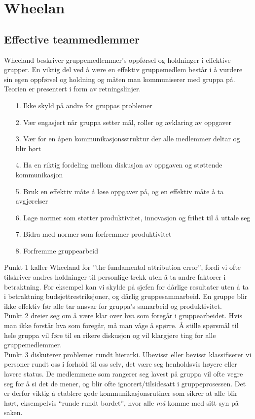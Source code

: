 \section{Wheelan}
\subsection{Effective teammedlemmer}

Wheeland beskriver gruppemedlemmer's oppførsel og holdninger i effektive grupper. En viktig del ved å være en effektiv gruppemedlem består i å vurdere sin egen oppførsel og holdning og måten man kommuniserer med gruppa på. Teorien er presentert i form av retningslinjer. 

\begin{itemize}
\item[1.] Ikke skyld på andre for gruppas problemer
\item[2.] Vær engasjert når gruppa setter mål, roller og avklaring av oppgaver
\item[3.] Vær for en åpen kommunikasjonsstruktur der alle medlemmer deltar og blir hørt 
\item[4.] Ha en riktig fordeling mellom diskusjon av oppgaven og støttende kommunikasjon
\item[5.] Bruk en effektiv måte å løse oppgaver på, og en effektiv måte å ta avgjørelser
\item[6.] Lage normer som støtter produktivitet, innovasjon og frihet til å uttale seg
\item[7.] Bidra med normer som forfremmer produktivitet
\item[8.] Forfremme gruppearbeid
\end{itemize}

Punkt 1 kaller Wheeland for ''the fundamental attribution error'', fordi vi ofte tilskriver andres holdninger til personlige trekk uten å ta andre faktorer i betraktning. For eksempel kan vi skylde på sjefen for dårlige resultater uten å ta i betraktning budsjettrestriksjoner, og dårlig gruppesammarbeid. En gruppe blir ikke effektiv før alle tar ansvar for gruppa's samarbeid og produktivitet. \\

Punkt 2 dreier seg om å være klar over hva som foregår i gruppearbeidet. Hvis man ikke forstår hva som foregår, må man våge å spørre. Å stille spørsmål til hele gruppa vil føre til en rikere diskusjon og vil klargjøre ting for alle gruppemedlemmer. \\

Punkt 3 diskuterer problemet rundt hierarki. Ubevisst eller bevisst
klassifiserer vi personer rundt oss i forhold til oss selv, det være seg
henholdsvis høyere eller lavere status. De medlemmene som rangerer seg lavest på
gruppa vil ofte vegre seg for å si det de mener, og blir ofte
ignorert/tilsidesatt i gruppeprosessen. Det er derfor viktig å etablere gode
kommunikasjonsrutiner som sikrer at alle blir hørt, eksempelvis ``runde rundt
bordet'', hvor alle \emph{må} komme med sitt syn på saken. 

